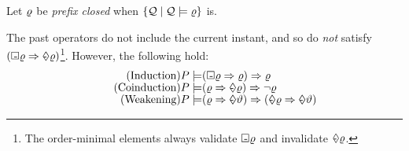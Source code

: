   Let $\varrho$ be \emph{prefix closed} when
  $\{ \mathcal{Q} \mid \mathcal{Q} \models \varrho \}$ is.


  The past operators do not include the current instant, and so
  do \emph{not} satisfy
  $(\Box\mkern-8.8mu\text{-}\mkern3mu\varrho\Rightarrow\Diamond\mkern-10.1mu\text{-}\mkern4mu\varrho)$\footnote{The order-minimal elements always validate
    $\Box\mkern-8.8mu\text{-}\mkern3mu\varrho$ and invalidate
    $\Diamond\mkern-10.1mu\text{-}\mkern4mu\varrho$.}.
  However, the following hold:
\begin{align*}
  \tag{Induction}
  \aPS \models& (\always\afo \Rightarrow\afo) \Rightarrow\afo
  \\[-1ex]
  \tag{Coinduction}
  \aPS \models& (\afo \Rightarrow\once{\afo}) \Rightarrow\lnot \afo
  \\[-1ex]
  \tag{Weakening}
  \aPS \models& (\afo \Rightarrow\once{\bfo}) \Rightarrow (\once\afo \Rightarrow\once{\bfo})
\end{align*}

